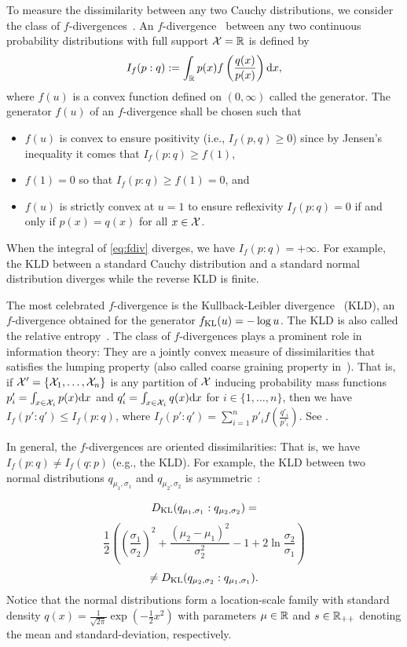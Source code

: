 \documentclass[journal]{IEEEtran}
\begin{document}
To measure the dissimilarity between any two Cauchy distributions,
we consider the class of $f$-divergences~\cite{fdiv-AliSilvey-1966,Csiszar-1967}.
An $f$-divergence~\cite{csiszar2004information}  between any two continuous probability distributions with full support $\mathcal{X}={\mathbb{R}}$ is defined by
\begin{equation}\label{eq:fdiv}
I_f(p:q) :=\int_{\bbR} p(x) f\left(\frac{q(x)}{p(x)}\right) \dx,
\end{equation}
where $f(u)$ is a convex function defined on $(0,\infty)$ called the generator.
The generator $f(u)$ of an $f$-divergence shall be chosen such that
\begin{itemize}
\item $f(u)$ is convex to ensure positivity (i.e., $I_f(p,q)\geq 0$) since by Jensen's inequality it comes that $I_f(p:q)\geq f(1)$, 
\item $f(1)=0$ so that $I_f(p:q)\geq f(1)=0$, and
\item $f(u)$ is strictly convex at $u=1$ to ensure reflexivity $I_f(p:q)=0$ if and only if $p(x)=q(x)$ for all $x\in\mathcal{X}$.
\end{itemize}
When the integral of \eqref{eq:fdiv} diverges, we have $I_f(p:q)=+\infty$.
For example, the KLD between a standard Cauchy distribution and a standard normal distribution diverges while the reverse KLD is finite.


The most celebrated $f$-divergence is the  Kullback-Leibler divergence~\cite{CT-2012} (KLD), an $f$-divergence obtained for the generator $f_{\mathrm{KL}}(u)=-\log u$. The KLD is also called the relative entropy~\cite{CT-2012}.
The class of $f$-divergences plays a prominent role in information theory: 
They are a jointly convex measure of dissimilarities that satisfies the lumping property (also called coarse graining property in~\cite{IG-2016}).
That is, if $\mathcal{X}'=\{\mathcal{X}_1,\ldots,\mathcal{X}_n\}$ is any partition of $\mathcal{X}$ inducing probability mass functions $p'_i =\int_{x\in\mathcal{X}_i} p(x)\mathrm{d}x$ and $q'_i =\int_{x\in\mathcal{X}_i} q(x)\mathrm{d}x$ for $i\in\{1,\ldots,n\}$, 
then we have $I_f(p':q')\leq I_f(p:q)$, where $I_f(p':q')=\sum_{i=1}^n p'_i f\left(\frac{q'_i}{p'_i}\right)$. 
See \cite{csiszar2004information,liese2006divergences}.

In general, the $f$-divergences are oriented dissimilarities: That is, we have $I_f(p:q) \not=I_f(q:p)$ (e.g., the KLD). 
For example, the KLD between two normal distributions $q_{\mu_1,\sigma_1}$  and $q_{\mu_2,\sigma_2}$ is asymmetric~\cite{CT-2012}:

\[ D_{\mathrm{KL}}(q_{\mu_1,\sigma_1}:q_{\mu_2,\sigma_2})= \]
 \[ \frac{1}{2}\left(\left(\frac{\sigma_{1}}{\sigma_{2}}\right)^{2}+\frac{\left(\mu_{2}-\mu_{1}\right)^{2}}{\sigma_{2}^{2}}-1+2 \ln \frac{\sigma_{2}}{\sigma_{1}}\right) \] 
 \[ \not=D_{\mathrm{KL}}(q_{\mu_2,\sigma_2}:q_{\mu_1,\sigma_1}).
\]
Notice that the normal distributions form a location-scale family with standard density $q(x)=\frac{1}{\sqrt{2\pi}}\exp\left(-\frac{1}{2}x^2\right)$ with parameters $\mu\in{\mathbb{R}}$ and $s\in{\mathbb{R}}_{++}$ denoting the mean and standard-deviation, respectively.
\end{document}
